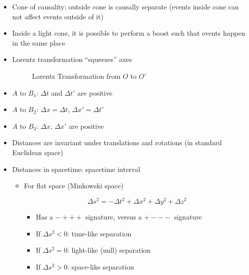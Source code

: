 \begin{itemize}
\begin{itemize}
      \item Cone of causality: outside cone is causally separate (events inside cone can not affect events outside of it)

      \item Inside a light cone, it is possible to perform a boost such that events happen in the same place

      \item Lorentz transformation ``squeezes'' axes

        \begin{figure}[H]
          \centering
          
          \caption{Lorentz Transformation from $O$ to $O'$}
          \label{fig:4}
        \end{figure}

      \item $A$ to $B_1$: $\Delta t$ and $\Delta t'$ are positive

      \item $A$ to $B_2$:  $\Delta x=\Delta t$, $\Delta x'=\Delta t'$

      \item $A$ to $B_3$: $\Delta x$, $\Delta x'$ are positive

      \item Distances are invariant under translations and rotations (in standard Euclidean space)

      \item Distances in spacetime: spacetime interval
        
        \begin{itemize}

          \item For flat space (Minkowski space)

            $$\Delta s^2=-\Delta t^2+\Delta x^2 + \Delta y^2+\Delta z^2$$

            \begin{itemize}

              \item Has a $-+++$ signature, versus a $+---$ signature

              \item If $\Delta s^2<0$: time-like separation

              \item If $\Delta s^2=0$: light-like (null) separation

              \item If $\Delta s^2>0$: space-like separation


\end{itemize}
\end{itemize}
\end{itemize}
\end{itemize}
